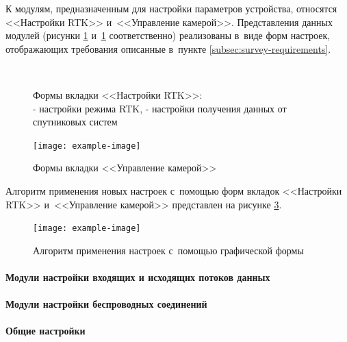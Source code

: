 К модулям, предназначенным для настройки параметров устройства, относятся <<Настройки RTK>> и~<<Управление камерой>>. Представления данных модулей (рисунки \ref{fig:rtk-settings} и~\ref{fig:rtk-settings} соответственно) реализованы в~виде форм настроек, отображающих требования описанные в~пункте \ref{subsec:survey-requirements}.

\begin{figure}[h!]
  \centering
  \setlength{\fboxsep}{5pt}
  \\
  \vspace*{6pt}
  \caption{
    Формы вкладки <<Настройки RTK>>:\\
    \protect{} - настройки режима RTK,
    \protect{} - настройки получения данных от спутниковых систем
  }
  \label{fig:rtk-settings}
\end{figure}

\begin{figure}[h!]
  \centering
  \setlength{\fboxsep}{5pt}
  \texttt{[image: example-image]}
  \vspace*{6pt}
  \caption{Формы вкладки <<Управление камерой>>}
  \label{fig:camera-control}
\end{figure}

Алгоритм применения новых настроек с~помощью форм вкладок <<Настройки RTK>> и~<<Управление камерой>> представлен на рисунке \ref{fig:basic-form-apply}.

\begin{figure}[h!]
  \centering
  \setlength{\fboxsep}{5pt}
  \texttt{[image: example-image]}
  \vspace*{6pt}
  \caption{Алгоритм применения настроек с~помощью графической формы}
  \label{fig:basic-form-apply}
\end{figure}

\paragraph{Модули настройки входящих и исходящих потоков данных}

\paragraph{Модули настройки беспроводных соединений}

\paragraph{Общие настройки}

\newpage
